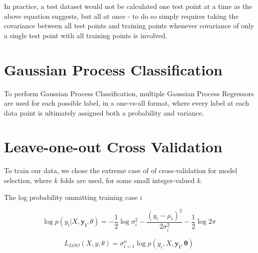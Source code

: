 In practice, a test dataset would not be calculated one test point at a time as the above equation suggests, but all at once - to do so simply requires taking the covariance between all test points and training points whenever covariance of only a single test point with all training points is involved.

% 

\section{Gaussian Process Classification}

To perform Gaussian Process Classification, multiple Gaussian Process Regressors are used for each possible label, in a one-vs-all format, where every label at each data point is ultimately assigned both a probability and variance.

\section{Leave-one-out Cross Validation}

To train our data, we chose the extreme case of of cross-validation for model selection, where $k$ folds are used, for some small integer-valued $k$. 

The log probability ommitting training case $i$

$$\log p(y_i|X, \mathbf{y_i}, \theta) = -\frac{1}{2}\log\sigma^2_i - \frac{(y_i - \mu_i)^2}{2 \sigma^2_i} - \frac{1}{2}\log2\pi$$

$$ L_{LOO}(X, y, \theta) = \sigma^n_{i=1} \log p(y_i, X, \mathbf{y_i}, \mathbf{\theta})$$

